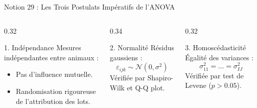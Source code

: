 \documentclass[aspectratio=169,10pt]{beamer}
\begin{document}
\begin{frame}{Notion 29 : Les Trois Postulats Impératifs de l'ANOVA}
  \begin{columns}[onlytextwidth, T]
    \begin{column}{0.32\linewidth}
      \begin{conceptbox}{1. Indépendance}
        \small
        Mesures indépendantes entre animaux :
        \begin{itemize}
          \item Pas d'influence mutuelle.
          \item Randomisation rigoureuse de l'attribution des lots.
        \end{itemize}
      \end{conceptbox}
    \end{column}
    \begin{column}{0.34\linewidth}
      \begin{conceptbox}{2. Normalité}
        \small
        Résidus gaussiens :
        \begin{equation*}
          \varepsilon_{ijk} \sim \mathcal{N}(0, \sigma^2)
        \end{equation*}
        Vérifiée par Shapiro-Wilk et Q-Q plot.
      \end{conceptbox}
    \end{column}
    \begin{column}{0.32\linewidth}
      \begin{conceptbox}{3. Homoscédasticité}
        \small
        Égalité des variances :
        \begin{equation*}
          \sigma_{11}^2 = \dots = \sigma_{IJ}^2
        \end{equation*}
        Vérifiée par test de Levene ($p > 0.05$).
      \end{conceptbox}
    \end{column}
  \end{columns}
\end{frame}
\end{document}
